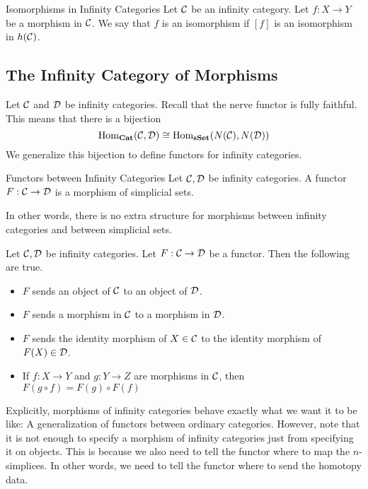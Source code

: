 \documentclass[a4paper]{article}
\begin{document}
\begin{defn}{Isomorphisms in Infinity Categories}{} Let $\mathcal{C}$ be an infinity category. Let $f:X\to Y$ be a morphism in $\mathcal{C}$. We say that $f$ is an isomorphism if $[f]$ is an isomorphism in $h(\mathcal{C})$. 
\end{defn}

\subsection{The Infinity Category of Morphisms}
Let $\mathcal{C}$ and $\mathcal{D}$ be infinity categories. Recall that the nerve functor is fully faithful. This means that there is a bijection $$\operatorname{Hom}_\bold{Cat}(\mathcal{C},\mathcal{D})\cong\operatorname{Hom}_\bold{sSet}(N(\mathcal{C}),N(\mathcal{D}))$$ We generalize this bijection to define functors for infinity categories. 

\begin{defn}{Functors between Infinity Categories}{} Let $\mathcal{C},\mathcal{D}$ be infinity categories. A functor $F:\mathcal{C}\to\mathcal{D}$ is a morphism of simplicial sets. 
\end{defn}

In other words, there is no extra structure for morphisms between infinity categories and between simplicial sets. 

\begin{lmm}{}{} Let $\mathcal{C},\mathcal{D}$ be infinity categories. Let $F:\mathcal{C}\to\mathcal{D}$ be a functor. Then the following are true. 
\begin{itemize}
\item $F$ sends an object of $\mathcal{C}$ to an object of $\mathcal{D}$. 
\item $F$ sends a morphism in $\mathcal{C}$ to a morphism in $\mathcal{D}$. 
\item $F$ sends the identity morphism of $X\in\mathcal{C}$ to the identity morphism of $F(X)\in\mathcal{D}$. 
\item If $f:X\to Y$ and $g:Y\to Z$ are morphisms in $\mathcal{C}$, then $F(g\circ f)=F(g)\circ F(f)$
\end{itemize}
\end{lmm}

Explicitly, morphisms of infinity categories behave exactly what we want it to be like: A generalization of functors between ordinary categories. However, note that it is not enough to specify a morphism of infinity categories just from specifying it on objects. This is because we also need to tell the functor where to map the $n$-simplices. In other words, we need to tell the functor where to send the homotopy data. \\
\end{document}
